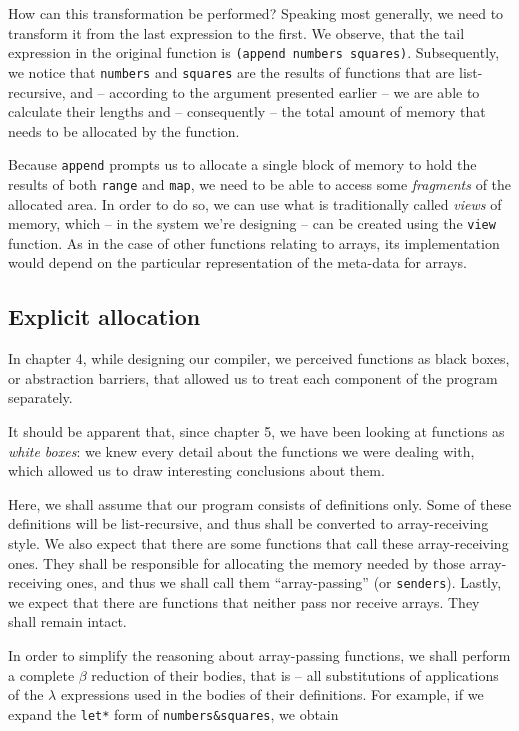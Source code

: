 How can this transformation be performed? Speaking most generally,
we need to transform it from the last expression to the first.
We observe, that the tail expression in the original function
is \texttt{(append numbers squares)}. Subsequently, we notice
that \texttt{numbers} and \texttt{squares} are the results of
functions that are list-recursive, and -- according to the argument
presented earlier -- we are able to calculate their lengths
and -- consequently -- the total amount of memory that needs to
be allocated by the function.

Because \texttt{append} prompts us to allocate a single block
of memory to hold the results of both \texttt{range} and \texttt{map},
we need to be able to access some \textit{fragments} of the allocated
area. In order to do so, we can use what is traditionally called
\textit{views} of memory, which -- in the system we're designing --
can be created using the \texttt{view} function. As in the case of
other functions relating to arrays, its implementation would depend
on the particular representation of the meta-data for arrays.

\subsection{Explicit allocation}

In chapter 4, while designing our compiler, we perceived functions
as black boxes, or abstraction barriers, that allowed us to treat
each component of the program separately.

It should be apparent that, since chapter 5, we have been looking
at functions as \textit{white boxes}: we knew every detail about the
functions we were dealing with, which allowed us to draw interesting
conclusions about them.

Here, we shall assume that our program consists of definitions only.
Some of these definitions will be list-recursive, and thus shall
be converted to array-receiving style. We also expect that there
are some functions that call these array-receiving ones. They shall
be responsible for allocating the memory needed by those array-receiving
ones, and thus we shall call them ``array-passing'' (or \texttt{senders}).
Lastly, we expect that there are functions that neither pass nor
receive arrays. They shall remain intact.

In order to simplify the reasoning about array-passing functions, we shall
perform a complete $\beta$ reduction of their bodies, that is -- all
substitutions of applications of the $\lambda$ expressions used in
the bodies of their definitions. For example, if we expand the \texttt{let*}
form of \texttt{numbers\&squares}, we obtain

